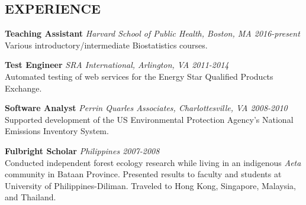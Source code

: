\documentclass[line, margin]{res}
\begin{document}
\begin{resume}
\section{EXPERIENCE}
\textbf{Teaching Assistant} \textit{Harvard School of Public Health, Boston, MA \hfill 2016-present} \\
Various introductory/intermediate Biostatistics courses.

\textbf{Test Engineer} \textit{SRA International, Arlington, VA \hfill 2011-2014} \\
Automated testing of web services for the Energy Star Qualified Products Exchange.

\textbf{Software Analyst} \textit{Perrin Quarles Associates, Charlottesville, VA \hfill 2008-2010} \\
Supported development of the US Environmental Protection Agency's National Emissions Inventory System.

\textbf{Fulbright Scholar} \textit{Philippines \hfill 2007-2008} \\
Conducted independent forest ecology research while living in an indigenous \textit{Aeta} community in Bataan Province.  Presented results to faculty and students at University of Philippines-Diliman.  Traveled to Hong Kong, Singapore, Malaysia, and Thailand.


\fancyfoot[C]{\thepage} %


\end{resume}
\end{document}
